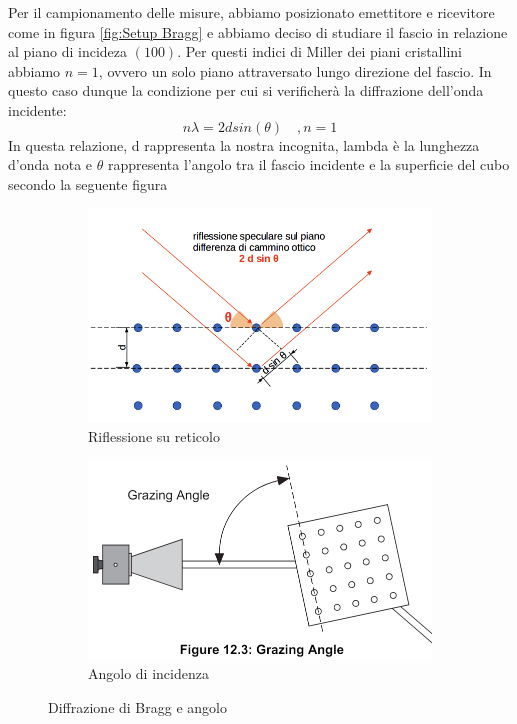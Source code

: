 \documentclass[letterpaper,12pt]{article}
\begin{document}
Per il campionamento delle misure, abbiamo posizionato emettitore e ricevitore come in figura \ref{fig:Setup Bragg}
e abbiamo deciso di studiare il fascio in relazione al piano di incideza $(100)$. Per questi indici di Miller dei piani cristallini abbiamo $n=1$, ovvero un solo piano attraversato lungo direzione del fascio.
In questo caso dunque la condizione per cui si verificherà la diffrazione dell'onda incidente:
\begin{equation}
	n \lambda = 2dsin(\theta) \quad ,n=1
	\label{eq:Legge Bragg}
\end{equation}
In questa relazione, d rappresenta la nostra incognita, lambda è la lunghezza d'onda nota e $\theta$ rappresenta
l'angolo tra il fascio incidente e la superficie del cubo secondo la seguente figura 
\begin{figure}[h!]
    \centering
    \begin{subfigure}[b]{0.28\textwidth}
        \centering
        \includegraphics[width=\textwidth]{diffrazione_bragg.png}
        \caption{Riflessione su reticolo}
        \label{fig:Reticolo Bragg}
    \end{subfigure}
    \hspace{0.3\textwidth} 
    \begin{subfigure}[b]{0.28\textwidth}
        \centering
        \includegraphics[width=\textwidth]{angolo_bragg.png}
        \caption{Angolo di incidenza}
        \label{fig:riflesso2}
    \end{subfigure}
    \caption{Diffrazione di Bragg e angolo}
    \label{fig:combined_figures}
\end{figure}
\end{document}
